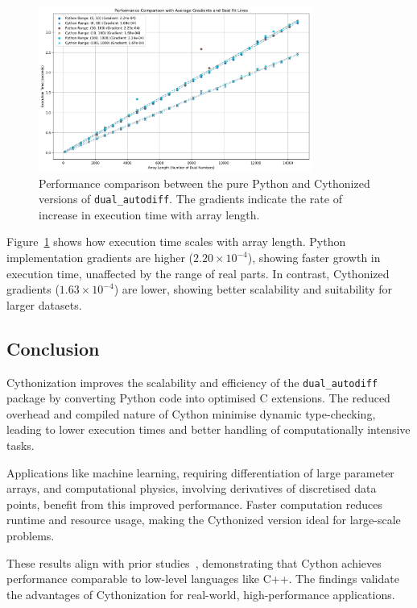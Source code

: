 \documentclass[a4paper,12pt]{article}
\begin{document}
\begin{figure}[h!]
    \centering
    \includegraphics[width=0.8\textwidth]{performance_comparison.png}
    \caption{Performance comparison between the pure Python and Cythonized versions of \texttt{dual\_autodiff}. The gradients indicate the rate of increase in execution time with array length.}
    \label{fig:performance_comparison}
\end{figure}

Figure~\ref{fig:performance_comparison} shows how execution time scales with array length. Python implementation gradients are higher (\(2.20 \times 10^{-4}\)), showing faster growth in execution time, unaffected by the range of real parts. In contrast, Cythonized gradients (\(1.63 \times 10^{-4}\)) are lower, showing better scalability and suitability for larger datasets.

\subsection{Conclusion}
Cythonization improves the scalability and efficiency of the \texttt{dual\_autodiff} package by converting Python code into optimised C extensions. The reduced overhead and compiled nature of Cython minimise dynamic type-checking, leading to lower execution times and better handling of computationally intensive tasks.

Applications like machine learning, requiring differentiation of large parameter arrays, and computational physics, involving derivatives of discretised data points, benefit from this improved performance. Faster computation reduces runtime and resource usage, making the Cythonized version ideal for large-scale problems.

These results align with prior studies~\cite{mortensen2016cython}, demonstrating that Cython achieves performance comparable to low-level languages like C++. The findings validate the advantages of Cythonization for real-world, high-performance applications.
\end{document}

